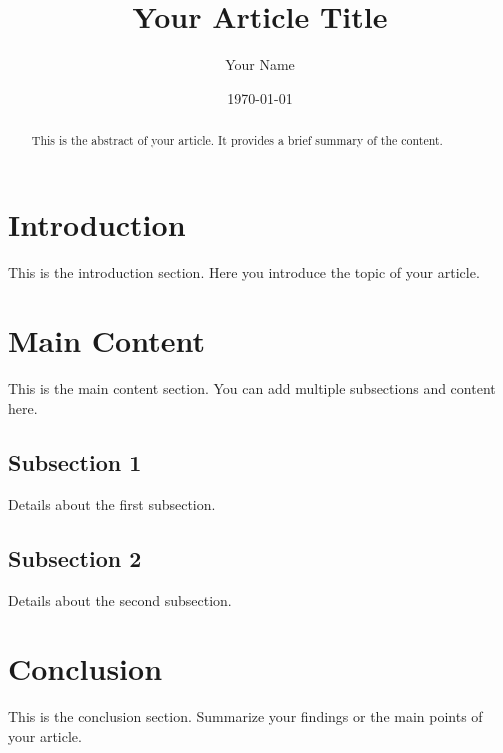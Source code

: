 \documentclass{article}
\title{Your Article Title}
\author{Your Name}
\date{\today}
\begin{document}
\maketitle

\begin{abstract}
This is the abstract of your article. It provides a brief summary of the content.
\end{abstract}

\section{Introduction}
This is the introduction section. Here you introduce the topic of your article.

\section{Main Content}
This is the main content section. You can add multiple subsections and content here.

\subsection{Subsection 1}
Details about the first subsection.

\subsection{Subsection 2}
Details about the second subsection.

\section{Conclusion}
This is the conclusion section. Summarize your findings or the main points of your article.
\end{document}
